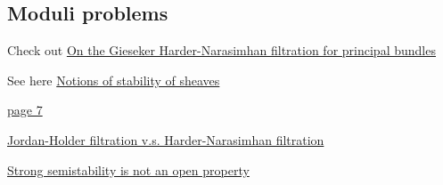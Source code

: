 \documentclass[main.tex]{subfiles}
\begin{document}
\subsection{Moduli problems}
\begin{example}
\end{example}

\begin{example}
\end{example}

\begin{example}
Check out \href{https://arxiv.org/pdf/1411.2884.pdf}{On the Gieseker Harder-Narasimhan filtration for principal bundles}
\end{example}
\begin{example}
See here \href{http://www.northeastern.edu/iloseu/Xiaolei_S16.pdf}{Notions of stability of sheaves}
\end{example}
\begin{example}
\href{http://www.northeastern.edu/iloseu/Barbara_S16.pdf}{page 7}
\end{example}

\begin{example}[$S$-equivalence]
\end{example}

\begin{example}
\href{https://mathoverflow.net/questions/180551/jordan-holder-vs-harder-narasimhan}{Jordan-Holder filtration v.s. Harder-Narasimhan filtration}
\end{example}



\begin{example}
\href{http://www.ams.org/books/pspum/080.1/2483939/pspum080.1-2483939.pdf}{Strong semistability is not an open property}
\end{example}








\begin{example}

\end{example}
\begin{example}

\end{example}
\begin{example}

\end{example}
\begin{remark}

\end{remark}
\end{document}
